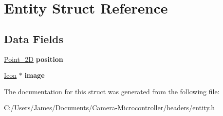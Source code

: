 \hypertarget{struct_entity}{}\section{Entity Struct Reference}
\label{struct_entity}
\subsection*{Data Fields}
\begin{DoxyCompactItemize}
\item 
\mbox{\label{struct_entity_a9fd6cf662e959dea378e15d0a1da64dd}} 
\hyperlink{struct_point__2_d}{Point\+\_\+2D} {\bfseries position}
\item 
\mbox{\label{struct_entity_a33d658e81673d6b85463c2e9aabc42c5}} 
\hyperlink{struct_icon}{Icon} $\ast$ {\bfseries image}
\end{DoxyCompactItemize}


The documentation for this struct was generated from the following file\+:\begin{DoxyCompactItemize}
\item 
C\+:/\+Users/\+James/\+Documents/\+Camera-\/\+Microcontroller/headers/entity.\+h\end{DoxyCompactItemize}

